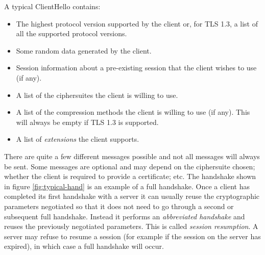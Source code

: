 A typical ClientHello contains:
\begin{itemize}
\item The highest protocol version supported by the client or, for TLS 1.3, a
list of all the supported protocol versions.
\item Some random data generated by the client.
\item Session information about a pre-existing session that the client wishes to
use (if any).
\item A list of the ciphersuites the client is willing to use.
\item A list of the compression methods the client is willing to use (if any).
This will always be empty if TLS 1.3 is supported.
\item A list of \emph{extensions} the client supports.
\end{itemize}

There are quite a few different messages possible and not all messages will 
always be sent. Some messages are optional and may depend on the ciphersuite 
chosen; whether the client is required to provide a certificate; etc. The 
handshake shown in figure \ref{fig:typical-hand} is an example of a full 
handshake. Once a client has completed its first handshake with a server it can 
usually reuse the cryptographic parameters negotiated so that it does not need 
to go through a second or subsequent full handshake. Instead it performs an 
\emph{abbreviated handshake} and reuses the previously negotiated parameters. 
This is called \emph{session resumption}. A server may refuse to resume a 
session (for example if the session on the server has expired), in which case a 
full handshake will occur.
